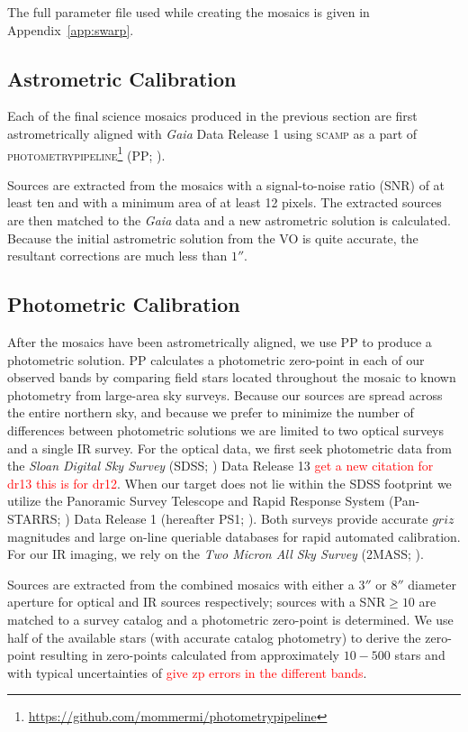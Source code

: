 \documentclass[apj, revtex4]{emulateapj}
\newcommand{\editorial}[1]{\textcolor{red}{#1}}
\begin{document}
The full parameter file used while creating the mosaics is given in Appendix~\ref{app:swarp}.

\subsection{Astrometric Calibration}
Each of the final science mosaics produced in the previous section are first astrometrically aligned with \textit{Gaia} \citep{GaiaCollaboration2016} Data Release 1 \citep{GaiaCollaboration2016a} using \textsc{scamp} \citep{Bertin2006} as a part of \textsc{photometrypipeline}\footnote{\url{https://github.com/mommermi/photometrypipeline}} (PP; \citealt{Mommert2017}).

Sources are extracted from the mosaics with a signal-to-noise ratio (SNR) of at least ten and with a minimum area of at least 12 pixels. The extracted sources are then matched to the \textit{Gaia} data and a new astrometric solution is calculated. Because the initial astrometric solution from the VO is quite accurate, the resultant corrections are much less than $1''$.

\subsection{Photometric Calibration}
After the mosaics have been astrometrically aligned, we use PP to produce a photometric solution. PP calculates a photometric zero-point in each of our observed bands by comparing field stars located throughout the mosaic to known photometry from large-area sky surveys. Because our sources are spread across the entire northern sky, and because we prefer to minimize the number of differences between photometric solutions we are limited to two optical surveys and a single IR survey. For the optical data, we first seek photometric data from the \textit{Sloan Digital Sky Survey} (SDSS; \citealt{York2000}) Data Release 13 \citep{Alam2015} \editorial{get a new citation for dr13 this is for dr12}. When our target does not lie within the SDSS footprint we utilize the Panoramic Survey Telescope and Rapid Response System (Pan-STARRS; \citealt{Chambers2016}) Data Release 1 (hereafter PS1; \citealt{Flewelling2016}). Both surveys provide accurate $griz$ magnitudes and large on-line queriable databases for rapid automated calibration. For our IR imaging, we rely on the \textit{Two Micron All Sky Survey} (2MASS; \citealt{Skrutskie2006}).

Sources are extracted from the combined mosaics with either a $3''$ or $8''$ diameter aperture for optical and IR sources respectively; sources with a SNR$\ge10$ are matched to a survey catalog and a photometric zero-point is determined. We use half of the available stars (with accurate catalog photometry) to derive the zero-point resulting in zero-points calculated from approximately $10-500$ stars and with typical uncertainties of \editorial{give zp errors in the different bands}.
\end{document}
